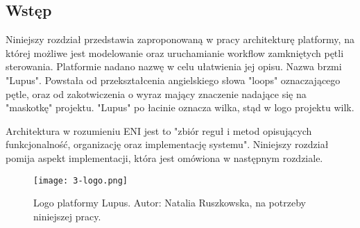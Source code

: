 \subsection{Wstęp}

Niniejszy rozdział przedstawia zaproponowaną w pracy architekturę  platformy, na której możliwe jest modelowanie oraz uruchamianie workflow zamkniętych pętli sterowania. Platformie nadano nazwę w celu ułatwienia jej opisu. Nazwa brzmi "Lupus". Powstała od przekształcenia angielskiego słowa "loops" oznaczającego pętle, oraz od zakotwiczenia o wyraz mający znaczenie nadające się na "maskotkę" projektu. "Lupus" po łacinie oznacza wilka, stąd w logo projektu wilk. 

Architektura w rozumieniu ENI jest to "zbiór reguł i metod opisujących funkcjonalność, organizację oraz implementację systemu". Niniejszy rozdział pomija aspekt implementacji, która jest omówiona w następnym rozdziale.

\begin{figure}[h]
    \centering
    \texttt{[image: 3-logo.png]}
    \caption{Logo platformy Lupus. Autor: Natalia Ruszkowska, na potrzeby niniejszej pracy.}
    \label{fig:logo}
\end{figure}
